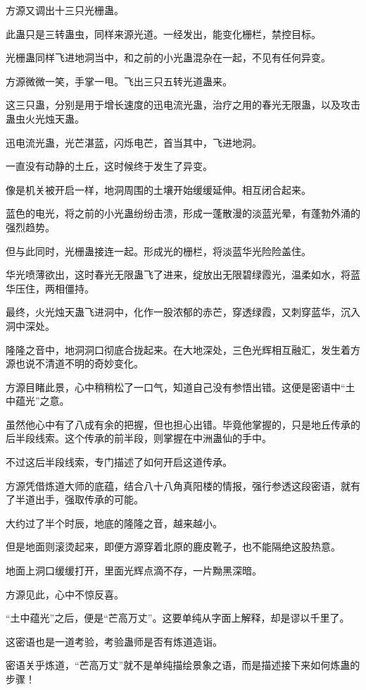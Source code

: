 \begin{this_body}
方源又调出十三只光栅蛊。

此蛊只是三转蛊虫，同样来源光道。一经发出，能变化栅栏，禁控目标。

光栅蛊同样飞进地洞当中，和之前的小光蛊混杂在一起，不见有任何异变。

方源微微一笑，手掌一甩。飞出三只五转光道蛊来。

这三只蛊，分别是用于增长速度的迅电流光蛊，治疗之用的春光无限蛊，以及攻击蛊虫火光烛天蛊。

迅电流光蛊，光芒湛蓝，闪烁电芒，首当其中，飞进地洞。

一直没有动静的土丘，这时候终于发生了异变。

像是机关被开启一样，地洞周围的土壤开始缓缓延伸。相互闭合起来。

蓝色的电光，将之前的小光蛊纷纷击溃，形成一蓬散漫的淡蓝光晕，有蓬勃外涌的强烈趋势。

但与此同时，光栅蛊接连一起。形成光的栅栏，将淡蓝华光险险盖住。

华光喷薄欲出，这时春光无限蛊飞了进来，绽放出无限碧绿霞光，温柔如水，将蓝华压住，两相僵持。

最终，火光烛天蛊飞进洞中，化作一股浓郁的赤芒，穿透绿霞，又刺穿蓝华，沉入洞中深处。

隆隆之音中，地洞洞口彻底合拢起来。在大地深处，三色光辉相互融汇，发生着方源也说不清道不明的奇妙变化。

方源目睹此景，心中稍稍松了一口气，知道自己没有参悟出错。这便是密语中“土中蕴光”之意。

虽然他心中有了八成有余的把握，但也担心出错。毕竟他掌握的，只是地丘传承的后半段线索。这个传承的前半段，则掌握在中洲蛊仙的手中。

不过这后半段线索，专门描述了如何开启这道传承。

方源凭借炼道大师的底蕴，结合八十八角真阳楼的情报，强行参透这段密语，就有了半道出手，强取传承的可能。

大约过了半个时辰，地底的隆隆之音，越来越小。

但是地面则滚烫起来，即便方源穿着北原的鹿皮靴子，也不能隔绝这股热意。

地面上洞口缓缓打开，里面光辉点滴不存，一片黝黑深暗。

方源见此，心中不惊反喜。

“土中蕴光”之后，便是“芒高万丈”。这要单纯从字面上解释，却是谬以千里了。

这密语也是一道考验，考验蛊师是否有炼道造诣。

密语关乎炼道，“芒高万丈”就不是单纯描绘景象之语，而是描述接下来如何炼蛊的步骤！


\end{this_body}
